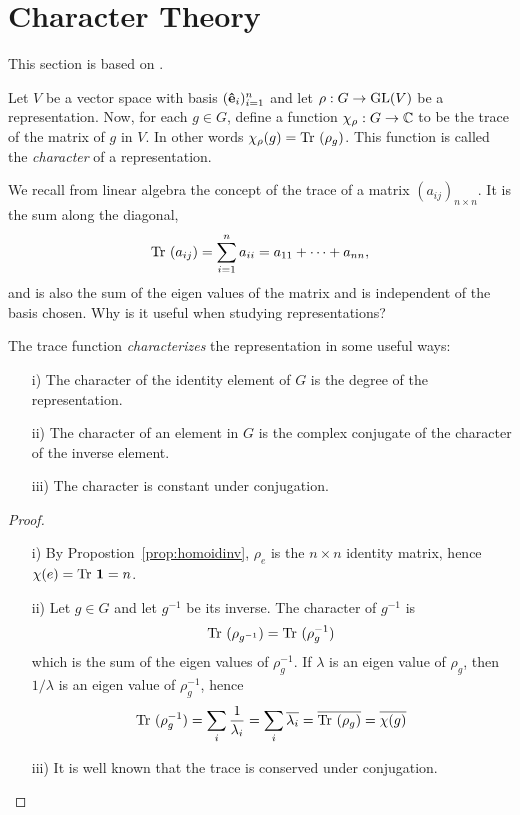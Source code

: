 \clearpage{\thispagestyle{empty}}
\section{Character Theory}

This section is based on \cite[Ch.2.]{Serre}.

Let $V$ be a vector space with basis $(\mathbf{\hat{e}}_i)_{i=1}^n$ and let $\rho: G \rightarrow \text{GL}(V)$ be a representation. Now, for each $g \in G$, define a function $\chi_{\rho}: G \rightarrow \mathbb{C}$ to be the trace of the matrix of $g$ in $V$. In other words $\chi_{\rho}(g) = \text{Tr }(\rho_g)$. This function is called the \emph{character} of a representation.

We recall from linear algebra the concept of the trace of a matrix $(a_{ij})_{n \times n}$. It is the sum along the diagonal,
\begin{align*}
	\text{Tr }(a_{ij})= \sum_{i=1}^{n} a_{ii} = a_{11} + \dots + a_{nn},
\end{align*}
and is also the sum of the eigen values of the matrix and is independent of the basis chosen. Why is it useful when studying representations?

\begin{proposition}\cite[Prop.2.1.]{Serre}
	The trace function \emph{characterizes} the representation in some useful ways:
	\begin{enumerate}
		\item[i)] The character of the identity element of $G$ is the degree of the representation.
		\item[ii)] The character of an element in $G$ is the complex conjugate of the character of the inverse element.
		\item[iii)] The character is constant under conjugation.
	\end{enumerate}
\end{proposition}
\begin{proof}
	\begin{enumerate}
		\item[i)] By Propostion~\ref{prop:homoidinv}, $\rho_e$ is the $n \times n$ identity matrix, hence $\chi(e) = \text{Tr } \mathbf{1} = n$.
		\item[ii)] Let $g \in G$ and let $g^{-1}$ be its inverse. The character of $g^{-1}$ is 
		\begin{align*}
			\text{Tr }(\rho_{g^{-1}}) = \text{Tr }(\rho_g^{-1})
		\end{align*}
		which is the sum of the eigen values of $\rho_g^{-1}$. If $\lambda$ is an eigen value of $\rho_g$, then $1/\lambda$ is an eigen value of $\rho_g^{-1}$, hence
		\begin{align*}
			\text{Tr }(\rho_g^{-1}) = \sum_i \frac{1}{\lambda_i} = \sum_i \overline{\lambda_i} = \overline{\text{Tr }(\rho_g)} = \overline{\chi(g)}
		\end{align*} 
		\item[iii)] It is well known that the trace is conserved under conjugation. \qedhere
	\end{enumerate}
\end{proof}

